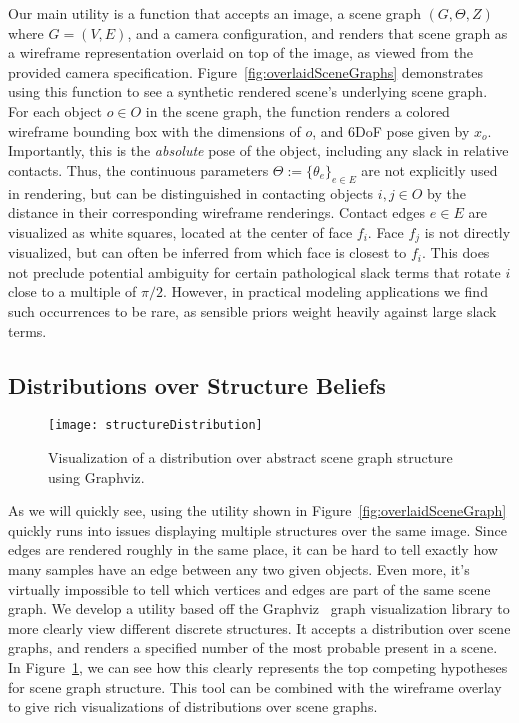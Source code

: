 Our main utility is a function that accepts an image, a scene graph $(G, \Theta, Z)$ where $G = (V,E)$, and a camera configuration, and renders that scene graph as a wireframe representation overlaid on top of the image, as viewed from the provided camera specification.
Figure~\ref{fig:overlaidSceneGraphs} demonstrates using this function to see a synthetic rendered scene's underlying scene graph.
For each object $o \in O$ in the scene graph, the function renders a colored wireframe bounding box with the dimensions of $o$, and 6DoF pose given by $x_o$.
Importantly, this is the \textit{absolute} pose of the object, including any slack in relative contacts.
Thus, the continuous parameters $\Theta := \{\theta_e\}_{e \in E}$ are not explicitly used in rendering, but can be distinguished in contacting objects $i,j \in O$ by the distance in their corresponding wireframe renderings.
Contact edges $e \in E$ are visualized as white squares, located at the center of face $f_i$.
Face $f_j$ is not directly visualized, but can often be inferred from which face is closest to $f_i$.
This does not preclude potential ambiguity for certain pathological slack terms that rotate $i$ close to a multiple of $\pi/2$.
However, in practical modeling applications we find such occurrences to be rare, as sensible priors weight heavily against large slack terms.

\subsection{Distributions over Structure Beliefs}
\begin{figure}[t]
  \centering
  \texttt{[image: structureDistribution]}
  \caption{
    Visualization of a distribution over abstract scene graph structure using Graphviz.
  }
  \label{fig:structureDistribution}
\end{figure}

As we will quickly see, using the utility shown in Figure~\ref{fig:overlaidSceneGraph} quickly runs into issues displaying multiple structures over the same image.
Since edges are rendered roughly in the same place, it can be hard to tell exactly how many samples have an edge between any two given objects.
Even more, it's virtually impossible to tell which vertices and edges are part of the same scene graph.
We develop a utility based off the Graphviz~\cite{Ellson03graphvizand} graph visualization library to more clearly view different discrete structures.
It accepts a distribution over scene graphs, and renders a specified number of the most probable present in a scene.
In Figure~\ref{fig:structureDistribution}, we can see how this clearly represents the top competing hypotheses for scene graph structure.
This tool can be combined with the wireframe overlay to give rich visualizations of distributions over scene graphs.

